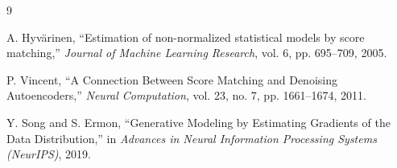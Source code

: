 \documentclass[11pt,a4paper]{article}
\begin{document}
\begin{thebibliography}{9}

A. Hyvärinen, ``Estimation of non-normalized statistical models by score matching,'' \textit{Journal of Machine Learning Research}, vol. 6, pp. 695–709, 2005.

P. Vincent, ``A Connection Between Score Matching and Denoising Autoencoders,'' \textit{Neural Computation}, vol. 23, no. 7, pp. 1661–1674, 2011.

Y. Song and S. Ermon, ``Generative Modeling by Estimating Gradients of the Data Distribution,'' in \textit{Advances in Neural Information Processing Systems (NeurIPS)}, 2019.

\end{thebibliography}
\end{document}
